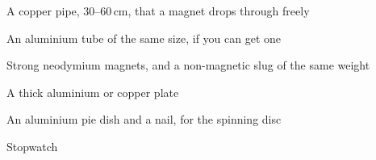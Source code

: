 



\begin{materials}
\item A copper pipe, 30--60\,cm, that a magnet drops through freely
\item An aluminium tube of the same size, if you can get one
\item Strong neodymium magnets, and a non-magnetic slug of the same weight
\item A thick aluminium or copper plate
\item An aluminium pie dish and a nail, for the spinning disc
\item Stopwatch
\end{materials}

